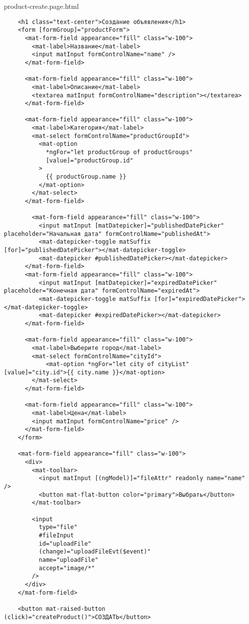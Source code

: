 product-create.page.html
\begin{lstlisting}
    <h1 class="text-center">Создание объявления</h1>
    <form [formGroup]="productForm">
      <mat-form-field appearance="fill" class="w-100">
        <mat-label>Название</mat-label>
        <input matInput formControlName="name" />
      </mat-form-field>
    
      <mat-form-field appearance="fill" class="w-100">
        <mat-label>Описание</mat-label>
        <textarea matInput formControlName="description"></textarea>
      </mat-form-field>
    
      <mat-form-field appearance="fill" class="w-100">
        <mat-label>Категория</mat-label>
        <mat-select formControlName="productGroupId">
          <mat-option
            *ngFor="let productGroup of productGroups"
            [value]="productGroup.id"
          >
            {{ productGroup.name }}
          </mat-option>
        </mat-select>
      </mat-form-field>
    
        <mat-form-field appearance="fill" class="w-100">
          <input matInput [matDatepicker]="publishedDatePicker" placeholder="Начальная дата" formControlName="publishedAt">
          <mat-datepicker-toggle matSuffix [for]="publishedDatePicker"></mat-datepicker-toggle>
          <mat-datepicker #publishedDatePicker></mat-datepicker>
      </mat-form-field>
      <mat-form-field appearance="fill" class="w-100">
          <input matInput [matDatepicker]="expiredDatePicker" placeholder="Конечная дата" formControlName="expiredAt">
          <mat-datepicker-toggle matSuffix [for]="expiredDatePicker"></mat-datepicker-toggle>
          <mat-datepicker #expiredDatePicker></mat-datepicker>
      </mat-form-field>
    
      <mat-form-field appearance="fill" class="w-100">
        <mat-label>Выберите город</mat-label>
        <mat-select formControlName="cityId">
            <mat-option *ngFor="let city of cityList" [value]="city.id">{{ city.name }}</mat-option>
        </mat-select>
      </mat-form-field>
    
      <mat-form-field appearance="fill" class="w-100">
        <mat-label>Цена</mat-label>
        <input matInput formControlName="price" />
      </mat-form-field>
    </form>
    
    <mat-form-field appearance="fill" class="w-100">
      <div>
        <mat-toolbar>
          <input matInput [(ngModel)]="fileAttr" readonly name="name" />
          <button mat-flat-button color="primary">Выбрать</button>
        </mat-toolbar>
    
        <input
          type="file"
          #fileInput
          id="uploadFile"
          (change)="uploadFileEvt($event)"
          name="uploadFile"
          accept="image/*"
        />
      </div>
    </mat-form-field>
    
    <button mat-raised-button (click)="createProduct()">СОЗДАТЬ</button>    
\end{lstlisting}


